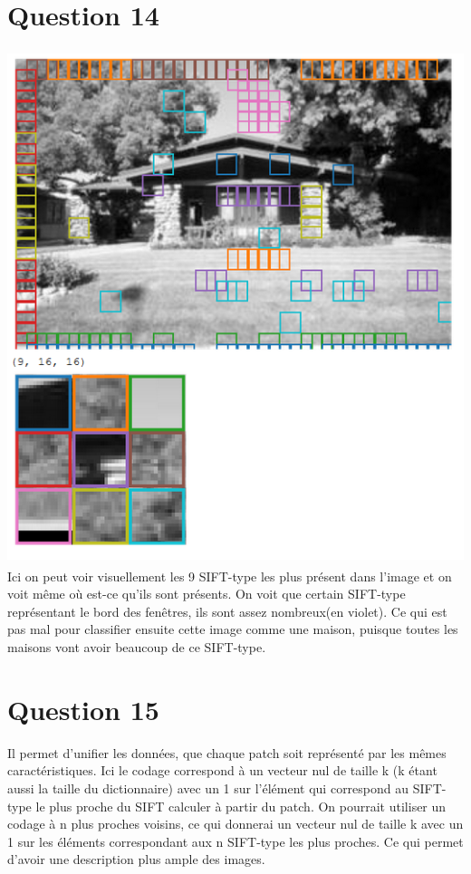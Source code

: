 \documentclass[11pt]{article}
\begin{document}
\section*{\large Question 14}
\includegraphics[height=15cm]{q14}
Ici on peut voir visuellement les 9 SIFT-type les plus présent dans l'image et on voit même où est-ce qu'ils sont présents. On voit que certain SIFT-type représentant le bord des fenêtres, ils sont assez nombreux(en violet). Ce qui est pas mal pour classifier ensuite cette image comme une maison, puisque toutes les maisons vont avoir beaucoup de ce SIFT-type. 
\section*{\large Question 15}
Il permet d'unifier les données, que chaque patch soit représenté par les mêmes caractéristiques. Ici le codage correspond à un vecteur nul de taille k (k étant aussi la taille du dictionnaire) avec un 1 sur l'élément qui correspond au SIFT-type le plus proche du SIFT calculer à partir du patch. On pourrait utiliser un codage à n plus proches voisins, ce qui donnerai un vecteur nul de taille k avec un 1 sur les éléments correspondant aux n SIFT-type les plus proches. Ce qui permet d'avoir une description plus ample des images. 
\end{document}
